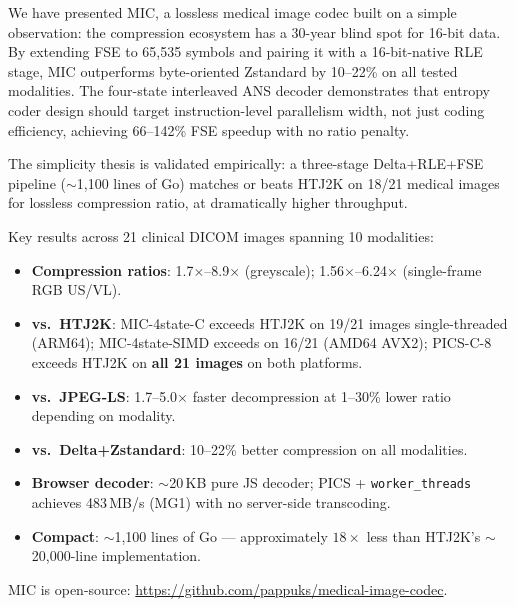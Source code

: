 \documentclass[journal]{IEEEtran}
\begin{document}
We have presented MIC, a lossless medical image codec built on a simple
observation: the compression ecosystem has a 30-year blind spot for 16-bit data.
By extending FSE to 65,535 symbols and pairing it with a 16-bit-native RLE
stage, MIC outperforms byte-oriented Zstandard by 10--22\% on all tested
modalities. The four-state interleaved ANS decoder demonstrates that entropy
coder design should target instruction-level parallelism width, not just coding
efficiency, achieving 66--142\% FSE speedup with no ratio penalty.

The simplicity thesis is validated empirically: a three-stage Delta+RLE+FSE
pipeline ($\sim$1,100 lines of Go) matches or beats HTJ2K on 18/21 medical
images for lossless compression ratio, at dramatically higher throughput.

Key results across 21 clinical DICOM images spanning 10 modalities:
\begin{itemize}
  \item \textbf{Compression ratios}: 1.7$\times$--8.9$\times$ (greyscale);
  1.56$\times$--6.24$\times$ (single-frame RGB US/VL).
  \item \textbf{vs.\ HTJ2K}: MIC-4state-C exceeds HTJ2K on 19/21 images
  single-threaded (ARM64); MIC-4state-SIMD exceeds on 16/21 (AMD64 AVX2);
  PICS-C-8 exceeds HTJ2K on \textbf{all 21 images} on both platforms.
  \item \textbf{vs.\ JPEG-LS}: 1.7--5.0$\times$ faster decompression at 1--30\%
  lower ratio depending on modality.
  \item \textbf{vs.\ Delta+Zstandard}: 10--22\% better compression on all
  modalities.
  \item \textbf{Browser decoder}: $\sim$20\,KB pure JS decoder; PICS +
  \texttt{worker\_threads} achieves 483\,MB/s (MG1) with no server-side
  transcoding.
  \item \textbf{Compact}: $\sim$1,100 lines of Go --- approximately $18\times$
  less than HTJ2K's $\sim$20,000-line implementation.
\end{itemize}

MIC is open-source: \url{https://github.com/pappuks/medical-image-codec}.

\end{document}
